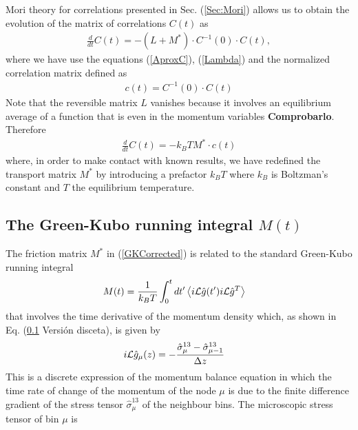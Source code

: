\documentclass[a4paper,openright,12pt]{book}
\newcommand{\esc}{\!\cdot\!}
\newcommand{\Note}[1]{{\bf \color{red}#1}}    %
\newcommand{\Pendiente}[1]{{\color{green}#1}} %
\newcommand{\llangle}{\left\langle}
\newcommand{\rrangle}{\right\rangle}
\begin{document}
Mori theory for correlations presented in Sec. (\ref{Sec:Mori}) allows us to obtain the evolution of the matrix of correlations $C(t)$ as
\begin{align}
    \frac{d}{dt}C(t) = -(L+M^*)\cdot C^{-1}(0)\cdot C(t),
\end{align}
where we have use the equations (\ref{AproxC}), (\ref{Lambda}) and the normalized correlation matrix defined as
\begin{align}
  c(t)=C^{-1}(0)\esc C(t)
\end{align}
Note that the reversible matrix $L$ vanishes because it involves an equilibrium average of a function that is even in the momentum variables \Note{Comprobarlo}. Therefore
\begin{align}
    \frac{d}{dt}C(t) = -k_BTM^*\cdot c(t)
    \label{AproxCg}
\end{align}
where, in order to make contact  with known results, we have redefined
the transport  matrix $M^*$  by introducing  a prefactor  $k_BT$ where
$k_B$ is Boltzman's constant and $T$ the equilibrium temperature. 

\subsection{The Green-Kubo running integral $M(t)$}
The friction matrix $M^*$ in (\ref{GKCorrected}) is
related to the standard Green-Kubo running integral
\begin{align}
M(t)&=\frac{1}{k_BT}\int_0^{t}dt' \llangle i{\cal L}\hat{g}(t')i{\cal L}\hat{g}^T\rrangle
\label{Mmunu}
\end{align}
that  involves the  time
derivative of the  momentum density which, as shown  in Eq. \Pendiente{(\ref{} Versión disceta)}, is
given by
\begin{align}
  i{\cal L}  \hat{g}_{\mu}(z)&=-\frac{\hat{\sigma}^{13}_{\mu}-\hat{\sigma}^{13}_{\mu-1}}{\Delta z}
\label{iLAcurrentx}
\end{align}
This  is a  discrete expression  of the  momentum balance  equation in
which the time rate of change of the momentum of the node $\mu$ is due
to   the   finite   difference   gradient   of   the   stress   tensor
$\hat{\sigma}^{13}_{\mu}$  of  the  neighbour bins.   The 
microscopic   stress   tensor   of  bin $\mu$ is 
\end{document}
